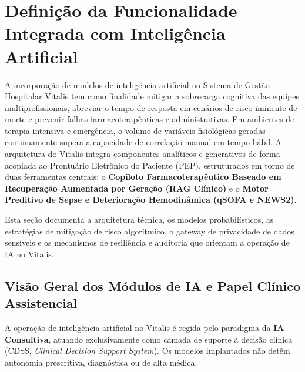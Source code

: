 
\section{Definição da Funcionalidade Integrada com Inteligência Artificial}
\label{sec:funcionalidade_ia}

A incorporação de modelos de inteligência artificial no Sistema de Gestão Hospitalar Vitalis tem como finalidade mitigar a sobrecarga cognitiva das equipes multiprofissionais, abreviar o tempo de resposta em cenários de risco iminente de morte e prevenir falhas farmacoterapêuticas e administrativas. Em ambientes de terapia intensiva e emergência, o volume de variáveis fisiológicas geradas continuamente supera a capacidade de correlação manual em tempo hábil. A arquitetura do Vitalis integra componentes analíticos e generativos de forma acoplada ao Prontuário Eletrônico do Paciente (PEP), estruturados em torno de duas ferramentas centrais: o \textbf{Copiloto Farmacoterapêutico Baseado em Recuperação Aumentada por Geração (RAG Clínico)} e o \textbf{Motor Preditivo de Sepse e Deterioração Hemodinâmica (qSOFA e NEWS2)}.

Esta seção documenta a arquitetura técnica, os modelos probabilísticos, as estratégias de mitigação de risco algorítmico, o gateway de privacidade de dados sensíveis e os mecanismos de resiliência e auditoria que orientam a operação de IA no Vitalis.

\subsection{Visão Geral dos Módulos de IA e Papel Clínico Assistencial}
\label{subsec:ia_visao_geral}

A operação de inteligência artificial no Vitalis é regida pelo paradigma da \textbf{IA Consultiva}, atuando exclusivamente como camada de suporte à decisão clínica (CDSS, \textit{Clinical Decision Support System}). Os modelos implantados não detêm autonomia prescritiva, diagnóstica ou de alta médica.

